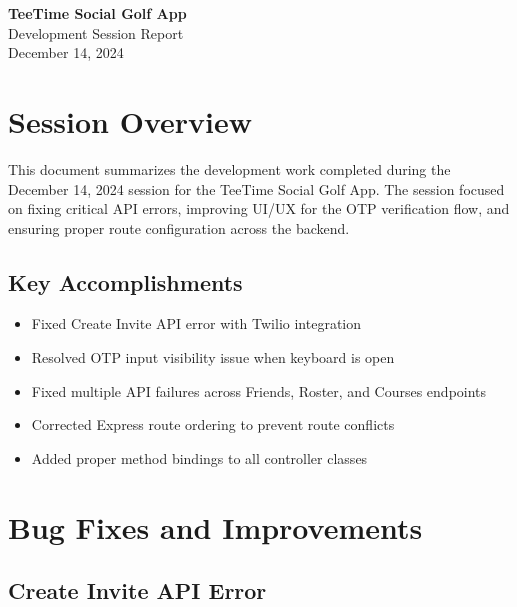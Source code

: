 \documentclass[11pt,a4paper]{article}
\begin{document}
\begin{center}
    {\Huge\bfseries\textcolor{primary}{TeeTime Social Golf App}}\\[0.5cm]
    {\LARGE Development Session Report}\\[0.3cm]
    {\large December 14, 2024}\\[1cm]
\end{center}

\tableofcontents
\newpage

\section{Session Overview}

This document summarizes the development work completed during the December 14, 2024 session for the TeeTime Social Golf App. The session focused on fixing critical API errors, improving UI/UX for the OTP verification flow, and ensuring proper route configuration across the backend.

\subsection{Key Accomplishments}
\begin{itemize}
    \item Fixed Create Invite API error with Twilio integration
    \item Resolved OTP input visibility issue when keyboard is open
    \item Fixed multiple API failures across Friends, Roster, and Courses endpoints
    \item Corrected Express route ordering to prevent route conflicts
    \item Added proper method bindings to all controller classes
\end{itemize}

\section{Bug Fixes and Improvements}

\subsection{Create Invite API Error}
\end{document}

